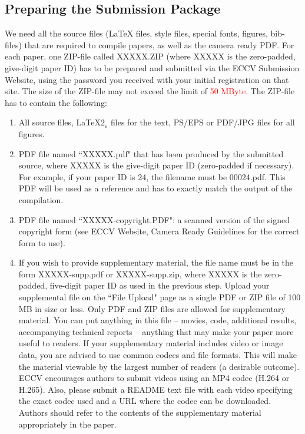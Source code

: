 \documentclass[runningheads]{llncs}
\begin{document}
\subsection{Preparing the Submission Package}
We need all the source files (\LaTeX{} files, style files, special fonts, figures, bib-files) that are required to compile papers, as well as the camera ready PDF. 
For each paper, one ZIP-file called XXXXX.ZIP (where XXXXX is the zero-padded, give-digit paper ID) has to be prepared and submitted via the ECCV \ECCVyear{} Submission Website, using the password you received with your initial registration on that site. 
The size of the ZIP-file may not exceed the limit of \textcolor{red}{50 MByte}. 
The ZIP-file has to contain the following:
  \begin{enumerate}
 \item All source files, \eg \LaTeX{}2$_\varepsilon$ files for the text, PS/EPS or PDF/JPG files for all figures.
 \item PDF file named ``XXXXX.pdf" that has been produced by the submitted source, where XXXXX is the give-digit paper ID (zero-padded if necessary). For example, if your paper ID is 24, the filename must be 00024.pdf. 
       This PDF will be used as a reference and has to exactly match the output of the compilation.
 \item PDF file named ``XXXXX-copyright.PDF": a scanned version of the signed copyright form (see ECCV \ECCVyear{} Website, Camera Ready Guidelines for the correct form to use). 
 \item If you wish to provide supplementary material, the file name must be in the form XXXXX-supp.pdf or XXXXX-supp.zip, where XXXXX is the zero-padded, five-digit paper ID as used in the previous step. 
       Upload your supplemental file on the ``File Upload" page as a single PDF or ZIP file of 100 MB in size or less. 
       Only PDF and ZIP files are allowed for supplementary material. 
       You can put anything in this file -- movies, code, additional results, accompanying technical reports -- anything that may make your paper more useful to readers.  
       If your supplementary material includes video or image data, you are advised to use common codecs and file formats.  
       This will make the material viewable by the largest number of readers (a desirable outcome). 
       ECCV encourages authors to submit videos using an MP4 codec (H.264 or H.265). 
       Also, please submit a README text file with each video specifying the exact codec used and a URL where the codec can be downloaded. 
       Authors should refer to the contents of the supplementary material appropriately in the paper.
 \end{enumerate}
\end{document}
